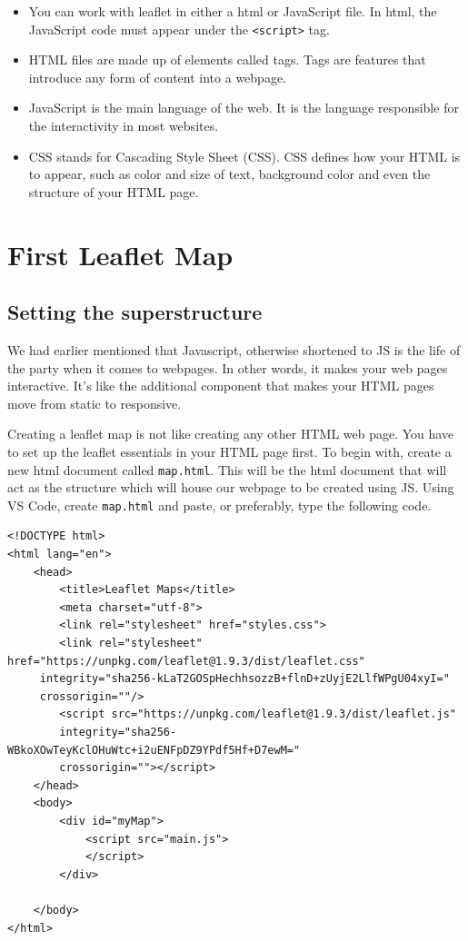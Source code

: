 \documentclass[
]{book}
\begin{document}
\begin{itemize}
\item
  You can work with leaflet in either a html or JavaScript file. In html,
  the JavaScript code must appear under the \texttt{\textless{}script\textgreater{}} tag.
\item
  HTML files are made up of elements called tags. Tags are features that introduce any form of content into a webpage.
\item
  JavaScript is the main language of the web. It is the language responsible for the interactivity in most websites.
\item
  CSS stands for Cascading Style Sheet (CSS). CSS defines how your HTML is to appear, such as color and size of text, background color and even the structure of your HTML page.
\end{itemize}

\hypertarget{first-leaflet-map}{%
\chapter{First Leaflet Map}\label{first-leaflet-map}}

\hypertarget{setting-the-superstructure}{%
\section{Setting the superstructure}\label{setting-the-superstructure}}

We had earlier mentioned that Javascript, otherwise shortened to JS is the life of the party when it comes to webpages. In other words, it makes your web pages interactive. It's like the additional component that makes your HTML pages move from static to responsive.

Creating a leaflet map is not like creating any other HTML web page. You have to set up the leaflet essentials in your HTML page first. To begin with, create a new html document called \texttt{map.html}. This will be the html document that will act as the structure which will house our webpage to be created using JS. Using VS Code, create \texttt{map.html} and paste, or preferably, type the following code.

\begin{verbatim}
<!DOCTYPE html>
<html lang="en">
    <head>
        <title>Leaflet Maps</title>
        <meta charset="utf-8">
        <link rel="stylesheet" href="styles.css">
        <link rel="stylesheet" href="https://unpkg.com/leaflet@1.9.3/dist/leaflet.css"
     integrity="sha256-kLaT2GOSpHechhsozzB+flnD+zUyjE2LlfWPgU04xyI="
     crossorigin=""/>
        <script src="https://unpkg.com/leaflet@1.9.3/dist/leaflet.js"
        integrity="sha256-WBkoXOwTeyKclOHuWtc+i2uENFpDZ9YPdf5Hf+D7ewM="
        crossorigin=""></script>
    </head>
    <body>
        <div id="myMap">
            <script src="main.js">
            </script> 
        </div>  
        
    </body>
</html>
\end{verbatim}
\end{document}
